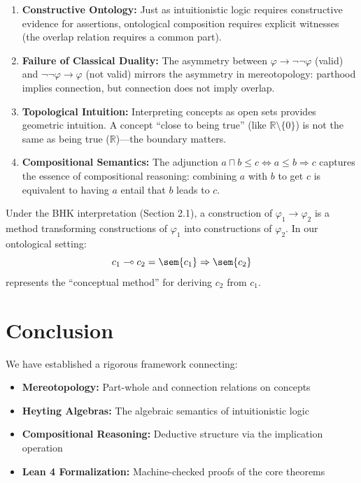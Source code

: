 \documentclass{itt-lean}
\begin{document}
\begin{enumerate}
	\item \textbf{Constructive Ontology:} Just as intuitionistic logic requires constructive evidence for assertions, ontological composition requires explicit witnesses (the overlap relation requires a common part).
	
	\item \textbf{Failure of Classical Duality:} The asymmetry between $\varphi \to \neg\neg\varphi$ (valid) and $\neg\neg\varphi \to \varphi$ (not valid) mirrors the asymmetry in mereotopology: parthood implies connection, but connection does not imply overlap.
	
	\item \textbf{Topological Intuition:} Interpreting concepts as open sets provides geometric intuition. A concept ``close to being true'' (like $\mathbb{R} \setminus \{0\}$) is not the same as being true ($\mathbb{R}$)---the boundary matters.
	
	\item \textbf{Compositional Semantics:} The adjunction $a \sqcap b \leq c \Leftrightarrow a \leq b \Rightarrow c$ captures the essence of compositional reasoning: combining $a$ with $b$ to get $c$ is equivalent to having $a$ entail that $b$ leads to $c$.
\end{enumerate}

\begin{observacao}
	Under the BHK interpretation (Section 2.1), a construction of $\varphi_1 \to \varphi_2$ is a method transforming constructions of $\varphi_1$ into constructions of $\varphi_2$. In our ontological setting:
	$$
	c_1 \multimap c_2 = \sem{c_1} \Rightarrow \sem{c_2}
	$$
	represents the ``conceptual method'' for deriving $c_2$ from $c_1$.
\end{observacao}

\section{Conclusion}

We have established a rigorous framework connecting:
\begin{itemize}
	\item \textbf{Mereotopology:} Part-whole and connection relations on concepts
	\item \textbf{Heyting Algebras:} The algebraic semantics of intuitionistic logic
	\item \textbf{Compositional Reasoning:} Deductive structure via the implication operation
	\item \textbf{Lean 4 Formalization:} Machine-checked proofs of the core theorems
\end{itemize}
\end{document}
